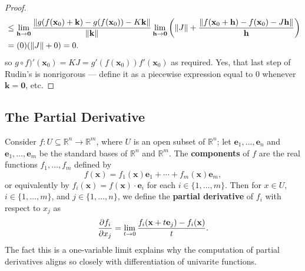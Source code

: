 \documentclass[11pt]{article}
\renewcommand{\vec}[1]{\mathbf{#1}}
\begin{document}
\begin{adjustwidth}{1cm}{}
\begin{proof}
\begin{align*}
			&\le \lim\limits_{\vec{h} \to \vec{0}} \frac{\norm{g(f(\vec{x}_{0}) + \vec{k}) - g(f(\vec{x}_{0})) - K \vec{k}}}{\norm{\vec{k}}} \lim\limits_{\vec{h} \to \vec{0}} \left( \norm{J} + \frac{\norm{f(\vec{x}_{0} + \vec{h}) - f(\vec{x}_{0}) - J \vec{h}}}{\vec{h}}\right) \\
			&= (0)(\norm{J} + 0) = 0.	
		\end{align*}
		so $g \circ f)'(\vec{x}_{0}) = KJ = g'(f(\vec{x}_{0})) f'(\vec{x}_{0})$ as required. Yes, that last step of Rudin's is nonrigorous --- define it as a piecewise expression equal to $0$ whenever $\vec{k} = \vec{0}$, etc.
	\end{proof}
\end{adjustwidth}


\subsection{The Partial Derivative}

Consider $f : U \subseteq \mathbb{R}^{n} \to \mathbb{R}^{m}$, where $U$ is an open subset of $\mathbb{R}^{n}$; let $\vec{e}_{1}, \ldots, \vec{e}_{n}$ and $\vec{e}_{1}, \ldots, \vec{e}_{m}$ be the standard bases of $\mathbb{R}^{n}$ and $\mathbb{R}^{m}$. The \textbf{components} of $f$ are the real functions $f_{1}, \ldots, f_{m}$ defined by
\[
	f(\vec{x}) = f_{1}(\vec{x}) \vec{e}_{1} + \cdots + f_{m}(\vec{x}) \vec{e}_{m},
\]
or equivalently by $f_{i}(\vec{x}) = f(\vec{x}) \cdot \vec{e}_{i}$ for each $i \in \{ 1, \ldots, m \}$. Then for $x \in U$, $i \in \{ 1, \ldots, m \}$, and $j \in \{ 1, \ldots, n \}$, we define the \textbf{partial derivative} of $f_{i}$ with respect to $x_{j}$ as
\[
	\pdv{f_{i}}{x_{j}} = \lim\limits_{t \to 0} \frac{f_{i}(\vec{x} + t \vec{e}_{j}) - f_{i}(\vec{x})}{t}.
\]
The fact this is a one-variable limit explains why the computation of partial derivatives aligns so closely with differentiation of univarite functions.
\end{document}
